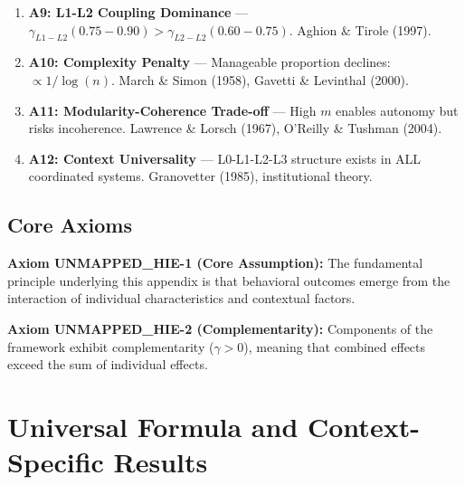 \begin{enumerate}
\item \textbf{A9: L1-L2 Coupling Dominance} — $\gamma_{L1-L2} (0.75-0.90) > \gamma_{L2-L2} (0.60-0.75)$. Aghion \& Tirole (1997).

\item \textbf{A10: Complexity Penalty} — Manageable proportion declines: $\propto 1/\log(n)$. March \& Simon (1958), Gavetti \& Levinthal (2000).

\item \textbf{A11: Modularity-Coherence Trade-off} — High $m$ enables autonomy but risks incoherence. Lawrence \& Lorsch (1967), O'Reilly \& Tushman (2004).

\item \textbf{A12: Context Universality} — L0-L1-L2-L3 structure exists in ALL coordinated systems. Granovetter (1985), institutional theory.

\end{enumerate}



\subsection{Core Axioms}
\label{sec:hie-axioms}

\begin{tcolorbox}[colback=yellow!5!white,colframe=yellow!75!black,title=Axiom UNMAPPED_HIE-1: Fundamental Principle]
\textbf{Axiom UNMAPPED_HIE-1 (Core Assumption):}
The fundamental principle underlying this appendix is that behavioral outcomes
emerge from the interaction of individual characteristics and contextual factors.
\end{tcolorbox}

\begin{tcolorbox}[colback=yellow!5!white,colframe=yellow!75!black,title=Axiom UNMAPPED_HIE-2: Complementarity]
\textbf{Axiom UNMAPPED_HIE-2 (Complementarity):}
Components of the framework exhibit complementarity ($\gamma > 0$), meaning
that combined effects exceed the sum of individual effects.
\end{tcolorbox}


\section{Universal Formula and Context-Specific Results}

